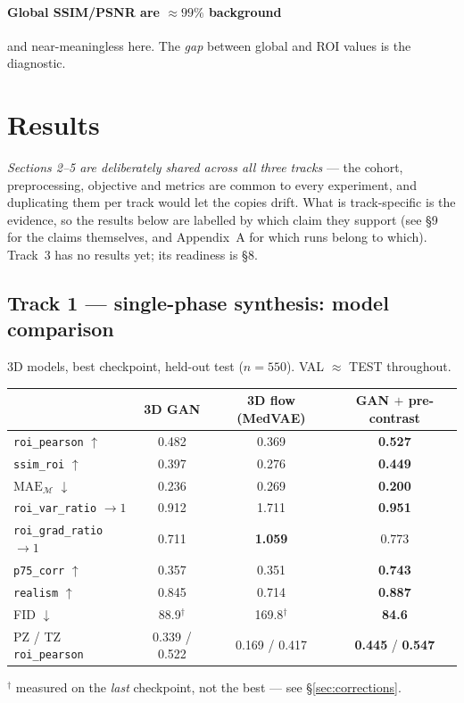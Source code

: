 \documentclass[11pt]{article}
\newcommand{\roi}{\mathcal{M}}
\newcommand{\1}{\mathbb{1}}
\begin{document}
\paragraph{Global SSIM/PSNR are $\approx99\%$ background} and near-meaningless here. The
\emph{gap} between global and ROI values is the diagnostic.

\section{Results}

\emph{Sections 2--5 are deliberately shared across all three tracks} --- the cohort,
preprocessing, objective and metrics are common to every experiment, and duplicating them
per track would let the copies drift. What is track-specific is the evidence, so the results
below are labelled by which claim they support (see \S9 for the claims themselves, and
Appendix~A for which runs belong to which). Track~3 has no results yet; its readiness is
\S8.

\subsection{Track 1 --- single-phase synthesis: model comparison}

3D models, best checkpoint, held-out test ($n=550$). VAL $\approx$ TEST throughout.

\begin{center}
\begin{tabular}{lccc}
\toprule
& 3D GAN & 3D flow (MedVAE) & GAN $+$ pre-contrast \\
\midrule
\texttt{roi\_pearson} $\uparrow$ & 0.482 & 0.369 & \textbf{0.527} \\
\texttt{ssim\_roi} $\uparrow$ & 0.397 & 0.276 & \textbf{0.449} \\
$\mathrm{MAE}_{\roi}$ $\downarrow$ & 0.236 & 0.269 & \textbf{0.200} \\
\texttt{roi\_var\_ratio} $\to1$ & 0.912 & 1.711 & \textbf{0.951} \\
\texttt{roi\_grad\_ratio} $\to1$ & 0.711 & \textbf{1.059} & 0.773 \\
\texttt{p75\_corr} $\uparrow$ & 0.357 & 0.351 & \textbf{0.743} \\
\texttt{realism} $\uparrow$ & 0.845 & 0.714 & \textbf{0.887} \\
FID $\downarrow$ & 88.9$^\dagger$ & 169.8$^\dagger$ & \textbf{84.6} \\
PZ / TZ \texttt{roi\_pearson} & 0.339 / 0.522 & 0.169 / 0.417 & \textbf{0.445} / \textbf{0.547} \\
\bottomrule
\end{tabular}
\end{center}
{\footnotesize $^\dagger$ measured on the \emph{last} checkpoint, not the best --- see
\S\ref{sec:corrections}.}
\end{document}
